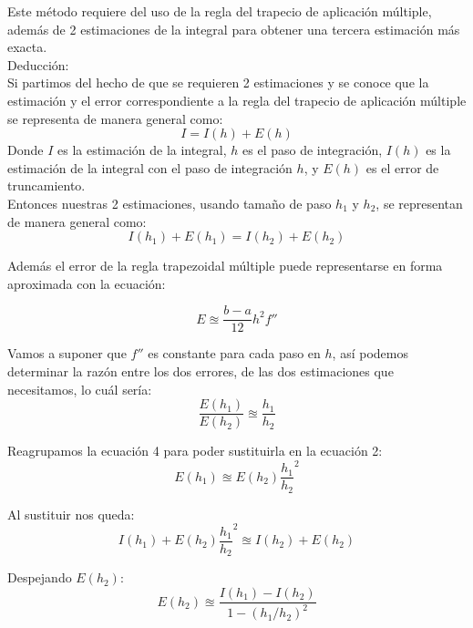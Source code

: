 \documentclass[journal,transmag]{IEEEtran}
\theoremstyle{mytheoremstyle}
\theoremstyle{mytheoremstyle}
\theoremstyle{myproblemstyle}
\begin{document}
Este método requiere del uso de la regla del trapecio de aplicación múltiple, además de 2 estimaciones de la integral para obtener una tercera estimación más exacta. \\

Deducción: \cite{chapra_mtodos_2007} \\
Si partimos del hecho de que se requieren 2 estimaciones y se conoce que la estimación y el error correspondiente a la regla del trapecio de aplicación
múltiple se representa de manera general como:
\begin{equation}
    I = I(h) + E(h)
\end{equation}
Donde $I$ es la estimación de la integral, $h$ es el paso de integración, $I(h)$ es la estimación de la integral con el paso de integración $h$, y $E(h)$ es el error de truncamiento. \\

Entonces nuestras 2 estimaciones, usando tamaño de paso $h_1$ y $h_2$, se representan de manera general como:
\begin{equation}
    I(h_1)+ E(h_1) = I(h_2) + E(h_2)
\end{equation}

Además el error de la regla trapezoidal múltiple puede representarse en forma aproximada con la ecuación:

\begin{equation} 
    E \approxeq \frac{b-a}{12}h^2f'' 
\end{equation}

Vamos a suponer que $f''$ es constante para cada paso en $h$, así podemos determinar la razón entre los dos errores, de las dos estimaciones que necesitamos, lo cuál sería: 
\begin{equation}
    \frac{E(h_1)}{E(h_2)} \approxeq \frac{h_1}{h_2}
\end{equation}

Reagrupamos la ecuación 4 para poder sustituirla en la ecuación 2:
\begin{equation}
    E(h_1) \approxeq E(h_2)\frac{h_1}{h_2}^2
\end{equation}

Al sustituir nos queda:
\begin{equation}
    I(h_1)+  E(h_2) \frac{h_1}{h_2}^2  \approxeq I(h_2) + E(h_2)
\end{equation}

Despejando $E(h_2)$:
\begin{equation}
    E(h_2) \approxeq \frac{I(h_1)-I(h_2)}{1- (h_1/h_2)^2}
\end{equation}
\end{document}
